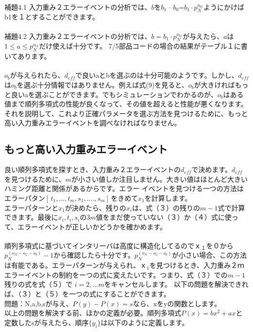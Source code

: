 \documentclass[20 pts]{article}
\begin{document}
\paragraph{}
補題4.1
入力重み２エラーイベントの分析では、$b$を$b_1$ $\cdot$  $b_0$=$b_1 \cdot p_N^{o_{b1}}$ようにかけばb1を１とすることができます。
\paragraph{}
補題4.2
入力重み２エラーイベントの分析では、$b= b_1 \cdot p_N^{o_{b1}}$が与えたら、$a$は$1\leq a \leq p_N^{o_{b1}}$だけ使えば十分です。
7/5部品コードの場合の結果がテーブル１に書いてあります。
\paragraph{}
$o_b$が与えられたら、$d_{eff}$で良いaとbを選ぶのは十分可能のようです。しかし、$d_{eff}$は$o_b$を選ぶ十分情報ではありません。例えば式(9)を見ると、$o_b$が大きければもっと良いaを選ぶことができます。でもシミュレーションでわかるのが、$o_b$はある値まで順列多項式の性能が良くなって、その値を超えると性能が悪くなります。それを説明して、これより正確パラメータを選ぶ方法を見つけるために、もっと高い入力重みエラーイベントを調べなければなりません。

\subsection{もっと高い入力重みエラーイベント}
良い順列多項式を探すとき、入力重み２エラーイベントの$d_{eff}$で決めます。$d_{eff}$を見つけるために、$m$が小さい値しか注目しません。大きい値はほとんど大きいハミング距離と関係があるからです。エラー
イベントを見つける一つの方法はエラーパタン$[\,t_1,...,t_m,s_1,....,s_m]\,$をきめて$x_1$を計算します。\\エラーパターンと$x_1$が決めたら、残りの$x_i$は、式（３）の残りの$ m-1$式で計算できます。最後に$x_i,t_i,s_i$の$3m$値をまだ使っていない（３）か（４）式に使って、エラーイベントが正しいかどうかを確かめます。
\paragraph{}
順列多項式に基づいてインタリーバは高度に構造化してるので$ｘ_１$を０から$p_N^{(o_N-o_2-o_b)}-1$から確認したら十分です。$p_N^{(o_N-o_2-o_b)}$が小さい場合、この方法は有能である。エラーパターンが与えられ、$ｘ_1$を見つけるとき、入力重み２ｍエラーイベントの制約をーつの式に変えたいです。つまり、式（３）での$m-1$残りの式を式（５）で $i=2,…m$をキャンセルします。
以下の問題を解決できれば、（３）と（５）を一つの式にすることができます。\\
問題：N,a,b,sが与え、$ P(y)-P(x)=s$なら、xをyの関数とします。\\以上の問題を解決する前、ほかの定義が必要。順列多項式$ P(x)= bx^2+ax$と定数したsが与えたら、順序$\{y_i\}$は以下のように定義します。
\end{document}
